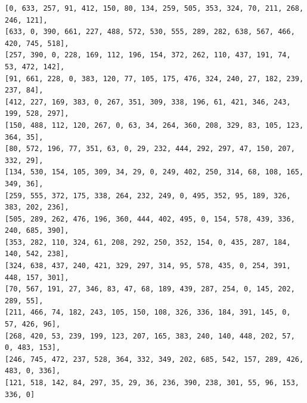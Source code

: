 \begin{lstlisting}[float, floatplacement=H, caption={Mapa de cidades para o problema do Caixeiro Viajante Adaptado.}, label=lst:cidades]
[0, 633, 257, 91, 412, 150, 80, 134, 259, 505, 353, 324, 70, 211, 268, 246, 121],
[633, 0, 390, 661, 227, 488, 572, 530, 555, 289, 282, 638, 567, 466, 420, 745, 518],
[257, 390, 0, 228, 169, 112, 196, 154, 372, 262, 110, 437, 191, 74, 53, 472, 142],
[91, 661, 228, 0, 383, 120, 77, 105, 175, 476, 324, 240, 27, 182, 239, 237, 84],
[412, 227, 169, 383, 0, 267, 351, 309, 338, 196, 61, 421, 346, 243, 199, 528, 297],
[150, 488, 112, 120, 267, 0, 63, 34, 264, 360, 208, 329, 83, 105, 123, 364, 35],
[80, 572, 196, 77, 351, 63, 0, 29, 232, 444, 292, 297, 47, 150, 207, 332, 29],
[134, 530, 154, 105, 309, 34, 29, 0, 249, 402, 250, 314, 68, 108, 165, 349, 36],
[259, 555, 372, 175, 338, 264, 232, 249, 0, 495, 352, 95, 189, 326, 383, 202, 236],
[505, 289, 262, 476, 196, 360, 444, 402, 495, 0, 154, 578, 439, 336, 240, 685, 390],
[353, 282, 110, 324, 61, 208, 292, 250, 352, 154, 0, 435, 287, 184, 140, 542, 238],
[324, 638, 437, 240, 421, 329, 297, 314, 95, 578, 435, 0, 254, 391, 448, 157, 301],
[70, 567, 191, 27, 346, 83, 47, 68, 189, 439, 287, 254, 0, 145, 202, 289, 55],
[211, 466, 74, 182, 243, 105, 150, 108, 326, 336, 184, 391, 145, 0, 57, 426, 96],
[268, 420, 53, 239, 199, 123, 207, 165, 383, 240, 140, 448, 202, 57, 0, 483, 153],
[246, 745, 472, 237, 528, 364, 332, 349, 202, 685, 542, 157, 289, 426, 483, 0, 336],
[121, 518, 142, 84, 297, 35, 29, 36, 236, 390, 238, 301, 55, 96, 153, 336, 0]
\end{lstlisting}